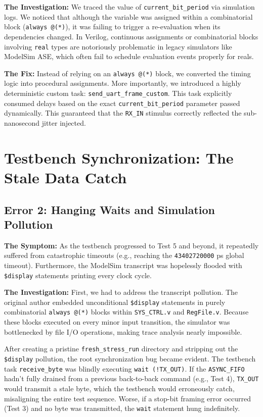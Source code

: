 \documentclass[11pt,a4paper]{article}
\begin{document}
\textbf{The Investigation:}
We traced the value of \texttt{current\_bit\_period} via simulation logs. We noticed that although the variable was assigned within a combinatorial block (\texttt{always @(*)}), it was failing to trigger a re-evaluation when its dependencies changed. In Verilog, continuous assignments or combinatorial blocks involving \texttt{real} types are notoriously problematic in legacy simulators like ModelSim ASE, which often fail to schedule evaluation events properly for reals.

\textbf{The Fix:}
Instead of relying on an \texttt{always @(*)} block, we converted the timing logic into procedural assignments. More importantly, we introduced a highly deterministic custom task: \texttt{send\_uart\_frame\_custom}. This task explicitly consumed delays based on the exact \texttt{current\_bit\_period} parameter passed dynamically. This guaranteed that the \texttt{RX\_IN} stimulus correctly reflected the sub-nanosecond jitter injected.

\section{Testbench Synchronization: The Stale Data Catch}

\subsection{Error 2: Hanging Waits and Simulation Pollution}
\textbf{The Symptom:}
As the testbench progressed to Test 5 and beyond, it repeatedly suffered from catastrophic timeouts (e.g., reaching the \texttt{43402720000} ps global timeout). Furthermore, the ModelSim transcript was hopelessly flooded with \texttt{\$display} statements printing every clock cycle.

\textbf{The Investigation:}
First, we had to address the transcript pollution. The original author embedded unconditional \texttt{\$display} statements in purely combinatorial \texttt{always @(*)} blocks within \texttt{SYS\_CTRL.v} and \texttt{RegFile.v}. Because these blocks executed on every minor input transition, the simulator was bottlenecked by file I/O operations, making trace analysis nearly impossible.

After creating a pristine \texttt{fresh\_stress\_run} directory and stripping out the \texttt{\$display} pollution, the root synchronization bug became evident. The testbench task \texttt{receive\_byte} was blindly executing \texttt{wait (!TX\_OUT)}. If the \texttt{ASYNC\_FIFO} hadn't fully drained from a previous back-to-back command (e.g., Test 4), \texttt{TX\_OUT} would transmit a stale byte, which the testbench would erroneously catch, misaligning the entire test sequence. Worse, if a stop-bit framing error occurred (Test 3) and no byte was transmitted, the \texttt{wait} statement hung indefinitely.
\end{document}
